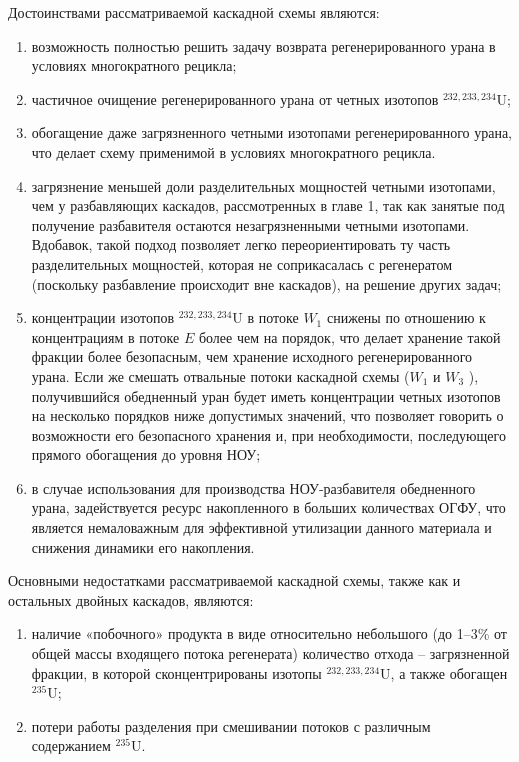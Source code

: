 Достоинствами рассматриваемой каскадной схемы являются:

\begin{enumerate}
    \item возможность полностью решить задачу возврата регенерированного урана в условиях многократного рецикла;
    \item частичное очищение регенерированного урана от четных изотопов $^{232,233,234}$U;
    \item обогащение даже загрязненного четными изотопами регенерированного урана, что делает схему применимой в условиях многократного рецикла.
    \item загрязнение меньшей доли разделительных мощностей четными изотопами, чем у разбавляющих каскадов, рассмотренных в главе 1, так как занятые под получение разбавителя остаются незагрязненными четными изотопами. Вдобавок, такой подход позволяет легко переориентировать ту часть разделительных мощностей, которая не соприкасалась с регенератом (поскольку разбавление происходит вне каскадов), на решение других задач;
    \item концентрации изотопов $^{232,233,234}$U в потоке $W_1$ снижены по отношению к концентрациям в потоке $E$ более чем на порядок, что делает хранение такой фракции более безопасным, чем хранение исходного регенерированного урана. Если же смешать отвальные потоки каскадной схемы ($W_1$  и $W_3$ ), получившийся обедненный уран будет иметь концентрации четных изотопов на несколько порядков ниже допустимых значений, что позволяет говорить о возможности его безопасного хранения и, при необходимости, последующего прямого обогащения до уровня НОУ;
    \item в случае использования для производства НОУ-разбавителя обедненного урана, задействуется ресурс накопленного в больших количествах ОГФУ, что является немаловажным для эффективной утилизации данного материала и снижения динамики его накопления.
\end{enumerate}

Основными недостатками рассматриваемой каскадной схемы, также как и остальных двойных каскадов, являются: 
\begin{enumerate}
    \item наличие «побочного» продукта в виде относительно небольшого (до 1–3\% от общей массы входящего потока регенерата) количество отхода -- загрязненной фракции, в которой сконцентрированы изотопы $^{232,233,234}$U, а также обогащен $^{235}$U;
    \item потери работы разделения при смешивании потоков с различным содержанием  $^{235}$U.
\end{enumerate}

